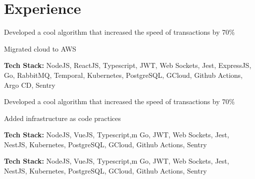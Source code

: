 \documentclass[]{resume}
\begin{document}
\begin{minipage}[t]{0.66\textwidth} 


\section{Experience}

\vspace{\topsep}
\begin{tightemize}
\item Developed a cool algorithm that increased the speed of transactions by 70\%
\item Migrated cloud to AWS
\item {\bf Tech Stack:} NodeJS, ReactJS, Typescript, JWT, Web Sockets, Jest, ExpressJS, Go, RabbitMQ, Temporal, Kubernetes, PostgreSQL, GCloud, Github Actions, Argo CD, Sentry\newline
\end{tightemize}

\begin{tightemize}
\item Developed a cool algorithm that increased the speed of transactions by 70\%
\item Added infrastructure as code practices
\item {\bf Tech Stack:} NodeJS, VueJS, Typescript,m Go, JWT, Web Sockets, Jest, NestJS, Kubernetes, PostgreSQL, GCloud, Github Actions, Sentry\newline
\end{tightemize}

\begin{tightemize}
\item {\bf Tech Stack:} NodeJS, VueJS, Typescript,m Go, JWT, Web Sockets, Jest, NestJS, Kubernetes, PostgreSQL, GCloud, Github Actions, Sentry\newline
\end{tightemize}

\end{minipage}
\end{document}

